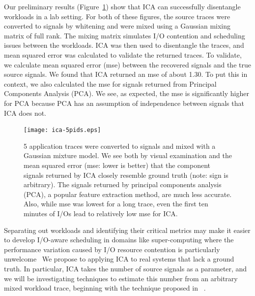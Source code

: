 Our preliminary results (Figure~\ref{fig:ica}) show that ICA
can successfully disentangle workloads in a lab setting.  For both of these
figures, the source traces were converted to signals by whitening and were mixed using
a Gaussian mixing matrix of full rank.
The mixing matrix simulates I/O
contention and scheduling issues between the workloads.  
ICA was then used to disentangle the
traces, and mean squared error was calculated to validate the returned traces.  
To validate, we calculate mean squared error (mse) between the recovered signals and
the true source signals.  We found that ICA returned an mse of about 1.30.  To
put this in context, we also calculated the mse for signals returned from
Principal Components Analysis (PCA).  We see, as expected, the mse is
significantly higher for PCA because PCA has an assumption of independence
between signals that ICA does not. 

\begin{figure}
  \centering
  \texttt{[image: ica-5pids.eps]}
  \caption{5 application traces were converted to signals and mixed with a
  Gaussian mixture model.  We see both by visual examination and the mean
  squared error (mse: lower is better) that the component signals returned by ICA closely resemble ground truth (note: sign is arbitrary).  The signals
  returned by principal components analysis (PCA), a popular feature extraction
  method, are much less accurate.  Also, while mse was lowest for a long
  trace, even the first ten minutes of I/Os lead to relatively low mse for ICA.}
  \label{fig:ica}
\end{figure}

Separating out workloads and identifying their critical metrics may make it
easier to develop I/O-aware scheduling in domains like super-computing where the
performance variation caused by I/O
resource contention is particularly unwelcome~\cite{liufast14}
We propose to applying ICA to real systems that lack a
ground truth. 
In particular, ICA takes the number of source signals as a
parameter, and we will be investigating techniques to estimate this number from
an arbitrary mixed workload trace, beginning with the technique proposed in
~\cite{Sparse component analysis and blind source separation of underdetermined
mixtures
}. %

